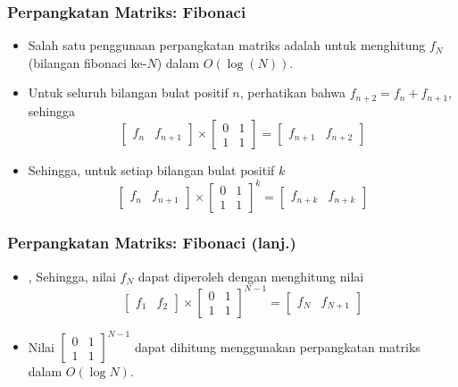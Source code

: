 \begin{frame}
\frametitle{Perpangkatan Matriks: Fibonaci}
\begin{itemize}
  \item Salah satu penggunaan perpangkatan matriks adalah untuk menghitung $f_N$ (bilangan fibonaci ke-$N$) dalam $O(\log(N))$.
  \item Untuk seluruh bilangan bulat positif $n$, perhatikan bahwa $f_{n+2} = f_n + f_{n+1}$, sehingga
\[
  \begin{bmatrix} f_n & f_{n+1} \end{bmatrix} \times
  \begin{bmatrix} 0 & 1 \\ 1 & 1  \end{bmatrix} =
  \begin{bmatrix} f_{n+1} & f_{n+2} \end{bmatrix}
\]
  \item Sehingga, untuk setiap bilangan bulat positif $k$
\[
  \begin{bmatrix} f_n & f_{n+1} \end{bmatrix} \times
  \begin{bmatrix} 0 & 1 \\ 1 & 1  \end{bmatrix}^k =
  \begin{bmatrix} f_{n+k} & f_{n+k} \end{bmatrix}
\]
\end{itemize}
\end{frame}

\begin{frame}
\frametitle{Perpangkatan Matriks: Fibonaci (lanj.)}
\begin{itemize}
  \item, Sehingga, nilai $f_N$ dapat diperoleh dengan menghitung nilai
  \[
    \begin{bmatrix} f_1 & f_2 \end{bmatrix} \times
    \begin{bmatrix} 0 & 1 \\ 1 & 1  \end{bmatrix}^{N - 1} =
    \begin{bmatrix} f_N & f_{N+1} \end{bmatrix}
  \]
  \item Nilai $\begin{bmatrix} 0 & 1 \\ 1 & 1  \end{bmatrix}^{N - 1}$ dapat dihitung menggunakan perpangkatan matriks dalam $O(\log N)$.
\end{itemize}
\end{frame}


